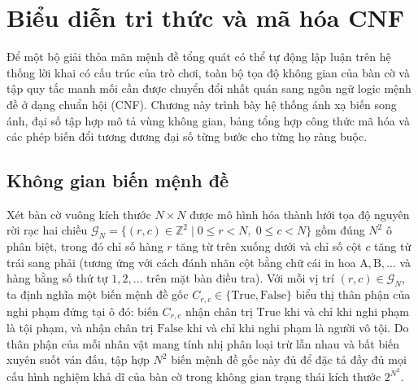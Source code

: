 \section{Biểu diễn tri thức và mã hóa CNF}
\label{sec:formulation}

Để một bộ giải thỏa mãn mệnh đề tổng quát có thể tự động lập luận trên hệ thống
lời khai có cấu trúc của trò chơi, toàn bộ tọa độ không gian của bàn cờ và tập quy
tắc manh mối cần được chuyển đổi nhất quán sang ngôn ngữ logic mệnh đề ở dạng
chuẩn hội (CNF). Chương này trình bày hệ thống ánh xạ biến song ánh, đại số tập
hợp mô tả vùng không gian, bảng tổng hợp công thức mã hóa và các phép biến đổi
tương đương đại số từng bước cho từng họ ràng buộc.

\subsection{Không gian biến mệnh đề}
\label{subsec:variable_mapping}
Xét bàn cờ vuông kích thước $N \times N$ được mô hình hóa thành lưới tọa độ nguyên
rời rạc hai chiều $\mathcal{G}_N = \{(r, c) \in \mathbb{Z}^2 \mid 0 \le r < N,\; 0
\le c < N\}$ gồm đúng $N^2$ ô phân biệt, trong đó chỉ số hàng $r$ tăng từ trên
xuống dưới và chỉ số cột $c$ tăng từ trái sang phải (tương ứng với cách đánh nhãn
cột bằng chữ cái in hoa $\text{A}, \text{B}, \dots$ và hàng bằng số thứ tự
$1, 2, \dots$ trên mặt bàn điều tra). Với mỗi vị trí $(r, c) \in \mathcal{G}_N$,
ta định nghĩa một biến mệnh đề gốc $C_{r,c} \in \{\text{True}, \text{False}\}$
biểu thị thân phận của nghi phạm đứng tại ô đó: biến $C_{r,c}$ nhận chân trị
$\text{True}$ khi và chỉ khi nghi phạm là tội phạm, và nhận chân trị $\text{False}$
khi và chỉ khi nghi phạm là người vô tội. Do thân phận của mỗi nhân vật mang tính
nhị phân loại trừ lẫn nhau và bất biến xuyên suốt ván đấu, tập hợp $N^2$ biến mệnh
đề gốc này đủ để đặc tả đầy đủ mọi cấu hình nghiệm khả dĩ của bàn cờ trong không
gian trạng thái kích thước $2^{N^2}$.

